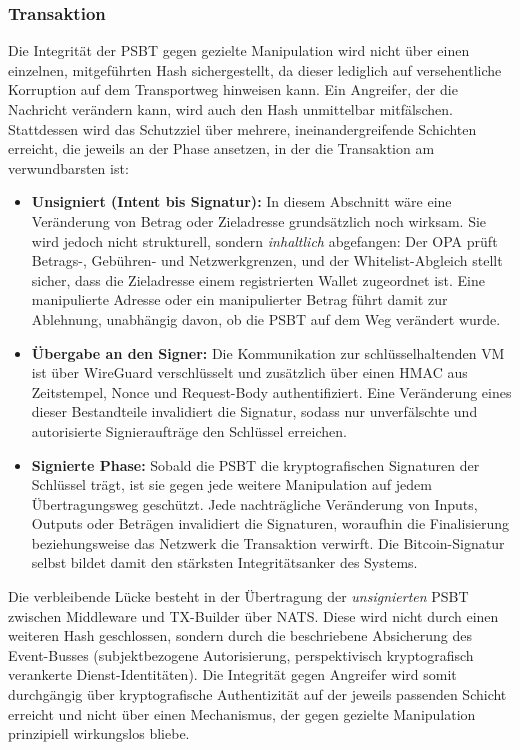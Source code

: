 \subsubsection{Transaktion}
Die Integrität der \ac{PSBT} gegen gezielte Manipulation wird nicht über einen einzelnen, mitgeführten Hash sichergestellt, da dieser lediglich auf versehentliche Korruption auf dem Transportweg hinweisen kann. Ein Angreifer, der die Nachricht verändern kann, wird auch den Hash unmittelbar mitfälschen. Stattdessen wird das Schutzziel über mehrere, ineinandergreifende Schichten erreicht, die jeweils an der Phase ansetzen, in der die Transaktion am verwundbarsten ist:
\begin{itemize}
\item \textbf{Unsigniert (Intent bis Signatur):} In diesem Abschnitt wäre eine Veränderung von Betrag oder Zieladresse grundsätzlich noch wirksam. Sie wird jedoch nicht strukturell, sondern \emph{inhaltlich} abgefangen: Der \ac{OPA} prüft Betrags-, Gebühren- und Netzwerkgrenzen, und der Whitelist-Abgleich stellt sicher, dass die Zieladresse einem registrierten Wallet zugeordnet ist. Eine manipulierte Adresse oder ein manipulierter Betrag führt damit zur Ablehnung, unabhängig davon, ob die \ac{PSBT} auf dem Weg verändert wurde.
\item \textbf{Übergabe an den Signer:} Die Kommunikation zur schlüsselhaltenden \ac{VM} ist über WireGuard verschlüsselt und zusätzlich über einen \ac{HMAC} aus Zeitstempel, Nonce und Request-Body authentifiziert. Eine Veränderung eines dieser Bestandteile invalidiert die Signatur, sodass nur unverfälschte und autorisierte Signieraufträge den Schlüssel erreichen.
\item \textbf{Signierte Phase:} Sobald die \ac{PSBT} die kryptografischen Signaturen der Schlüssel trägt, ist sie gegen jede weitere Manipulation auf jedem Übertragungsweg geschützt. Jede nachträgliche Veränderung von Inputs, Outputs oder Beträgen invalidiert die Signaturen, woraufhin die Finalisierung beziehungsweise das Netzwerk die Transaktion verwirft. Die Bitcoin-Signatur selbst bildet damit den stärksten Integritätsanker des Systems.
\end{itemize}
Die verbleibende Lücke besteht in der Übertragung der \emph{unsignierten} \ac{PSBT} zwischen Middleware und TX-Builder über \ac{NATS}. Diese wird nicht durch einen weiteren Hash geschlossen, sondern durch die beschriebene Absicherung des Event-Busses (subjektbezogene Autorisierung, perspektivisch kryptografisch verankerte Dienst-Identitäten). Die Integrität gegen Angreifer wird somit durchgängig über kryptografische Authentizität auf der jeweils passenden Schicht erreicht und nicht über einen Mechanismus, der gegen gezielte Manipulation prinzipiell wirkungslos bliebe.

